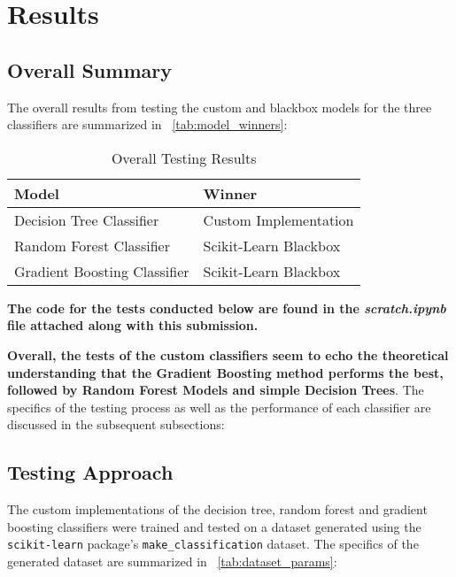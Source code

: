 \graphicspath{{images/}}

\section{Results}

\subsection{Overall Summary}

The overall results from testing the custom and blackbox models for the three classifiers are summarized in ~\autoref{tab:model_winners}:

\begin{table}[H]
  \centering
  \caption{Overall Testing Results}
  \label{tab:model_winners}
  \begin{tabularx}{0.85\textwidth}{X|X}
    \toprule
    \textbf{Model}               & \textbf{Winner}       \\
    \midrule
    Decision Tree Classifier     & Custom Implementation \\
    Random Forest Classifier     & Scikit-Learn Blackbox \\
    Gradient Boosting Classifier & Scikit-Learn Blackbox \\
    \bottomrule
  \end{tabularx}
\end{table}
\FloatBarrier

\textbf{The code for the tests conducted below are found in the \textit{scratch.ipynb} file attached along with this submission.}

\textbf{Overall, the tests of the custom classifiers seem to echo the theoretical understanding that the Gradient Boosting method performs the best, followed by Random Forest Models and simple Decision Trees}. The specifics of the testing process as well as the performance of each classifier are discussed in the subsequent subsections:

\subsection{Testing Approach}

The custom implementations of the decision tree, random forest and gradient boosting classifiers were trained and tested on a dataset generated using the \texttt{scikit-learn} package's \texttt{make\_classification} dataset. The specifics of the generated dataset are summarized in ~\autoref{tab:dataset_params}:

